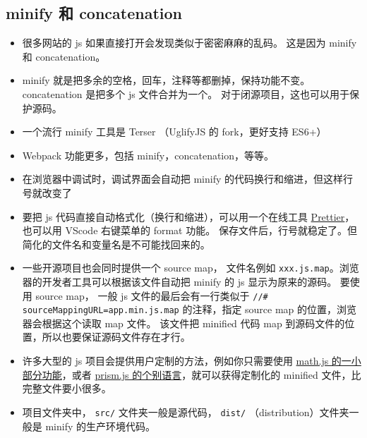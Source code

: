 \subsection{minify 和 concatenation}
\begin{itemize}
\item 很多网站的 js 如果直接打开会发现类似于密密麻麻的乱码。 这是因为 minify 和 concatenation。
\item minify 就是把多余的空格，回车，注释等都删掉，保持功能不变。 concatenation 是把多个 js 文件合并为一个。 对于闭源项目，这也可以用于保护源码。
\item 一个流行 minify 工具是 Terser （UglifyJS 的 fork，更好支持 ES6+）
\item Webpack 功能更多，包括 minify，concatenation，等等。
\item 在浏览器中调试时，调试界面会自动把 minify 的代码换行和缩进，但这样行号就改变了
\item 要把 js 代码直接自动格式化（换行和缩进），可以用一个在线工具 \href{https://prettier.io/playground/}{Prettier}，也可以用 VScode 右键菜单的 format 功能。 保存文件后，行号就稳定了。但简化的文件名和变量名是不可能找回来的。
\item 一些开源项目也会同时提供一个 source map， 文件名例如 \verb`xxx.js.map`。浏览器的开发者工具可以根据该文件自动把 minify 的 js 显示为原来的源码。 要使用 source map， 一般 js 文件的最后会有一行类似于 \verb`//# sourceMappingURL=app.min.js.map` 的注释，指定 source map 的位置，浏览器会根据这个读取 map 文件。 该文件把 minified 代码 map 到源码文件的位置，所以也要保证源码文件存在才行。
\item 许多大型的 js 项目会提供用户定制的方法，例如你只需要使用 \href{https://mathjs.org/docs/custom_bundling.html}{math.js 的一小部分功能}，或者 \href{https://prismjs.com/download.html#themes=prism&languages=markup+css+clike+javascript}{prism.js 的个别语言}，就可以获得定制化的 minified 文件，比完整文件要小很多。
\item 项目文件夹中， \verb`src/` 文件夹一般是源代码， \verb`dist/` （distribution）文件夹一般是 minify 的生产环境代码。
\end{itemize}
